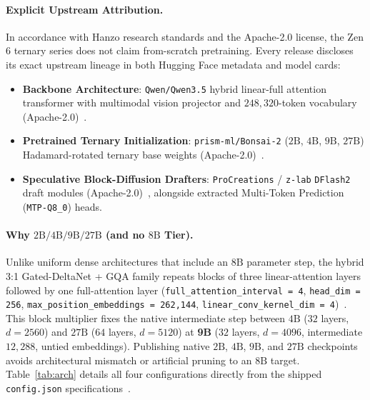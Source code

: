 \documentclass[11pt,a4paper]{article}
\begin{document}
\paragraph{Explicit Upstream Attribution.}
In accordance with Hanzo research standards and the Apache-2.0 license, the Zen 6 ternary series does not claim from-scratch pretraining. Every release discloses its exact upstream lineage in both Hugging Face metadata and model cards:
\begin{itemize}[noitemsep]
  \item \textbf{Backbone Architecture}: \texttt{Qwen/Qwen3.5} hybrid linear-full attention transformer with multimodal vision projector and $248{,}320$-token vocabulary (Apache-2.0)~\cite{qwen2026qwen35,yang2024gateddeltanet}.
  \item \textbf{Pretrained Ternary Initialization}: \texttt{prism-ml/Bonsai-2} ($2\text{B}$, $4\text{B}$, $9\text{B}$, $27\text{B}$) Hadamard-rotated ternary base weights (Apache-2.0)~\cite{prismml2026bonsai2}.
  \item \textbf{Speculative Block-Diffusion Drafters}: \texttt{ProCreations} / \texttt{z-lab} \texttt{DFlash2} draft modules (Apache-2.0)~\cite{procreations2026dflash2}, alongside extracted Multi-Token Prediction (\texttt{MTP-Q8\_0}) heads.
\end{itemize}

\paragraph{Why $2\text{B} / 4\text{B} / 9\text{B} / 27\text{B}$ (and no $8\text{B}$ Tier).}
Unlike uniform dense architectures that include an $8\text{B}$ parameter step, the hybrid 3:1 Gated-DeltaNet + GQA family repeats blocks of three linear-attention layers followed by one full-attention layer (\texttt{full\_attention\_interval = 4}, \texttt{head\_dim = 256}, \texttt{max\_position\_embeddings = 262,144}, \texttt{linear\_conv\_kernel\_dim = 4})~\cite{yang2024gateddeltanet,qwen2026qwen35}. This block multiplier fixes the native intermediate step between $4\text{B}$ ($32$ layers, $d=2560$) and $27\text{B}$ ($64$ layers, $d=5120$) at \textbf{9B} ($32$ layers, $d=4096$, intermediate $12{,}288$, untied embeddings). Publishing native $2\text{B}$, $4\text{B}$, $9\text{B}$, and $27\text{B}$ checkpoints avoids architectural mismatch or artificial pruning to an $8\text{B}$ target. Table~\ref{tab:arch} details all four configurations directly from the shipped \texttt{config.json} specifications~\cite{hanzo2026weights}.
\end{document}
